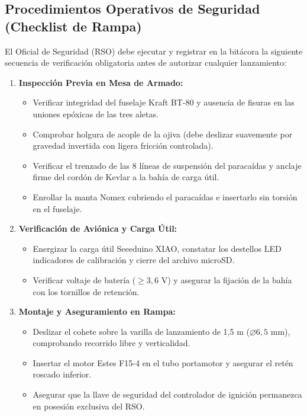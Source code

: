 \subsection{Procedimientos Operativos de Seguridad (Checklist de Rampa)}
El Oficial de Seguridad (RSO) debe ejecutar y registrar en la bitácora la siguiente secuencia de verificación obligatoria antes de autorizar cualquier lanzamiento:
\begin{enumerate}[leftmargin=1.5em]
    \item \textbf{Inspección Previa en Mesa de Armado:}
    \begin{itemize}
        \item Verificar integridad del fuselaje Kraft BT-80 y ausencia de fisuras en las uniones epóxicas de las tres aletas.
        \item Comprobar holgura de acople de la ojiva (debe deslizar suavemente por gravedad invertida con ligera fricción controlada).
        \item Verificar el trenzado de las 8 líneas de suspensión del paracaídas y anclaje firme del cordón de Kevlar a la bahía de carga útil.
        \item Enrollar la manta Nomex cubriendo el paracaídas e insertarlo sin torsión en el fuselaje.
    \end{itemize}
    \item \textbf{Verificación de Aviónica y Carga Útil:}
    \begin{itemize}
        \item Energizar la carga útil Seeeduino XIAO, constatar los destellos LED indicadores de calibración y cierre del archivo microSD.
        \item Verificar voltaje de batería ($\ge 3,6\text{ V}$) y asegurar la fijación de la bahía con los tornillos de retención.
    \end{itemize}
    \item \textbf{Montaje y Aseguramiento en Rampa:}
    \begin{itemize}
        \item Deslizar el cohete sobre la varilla de lanzamiento de 1,5 m ($\varnothing 6,5\text{ mm}$), comprobando recorrido libre y verticalidad.
        \item Insertar el motor Estes F15-4 en el tubo portamotor y asegurar el retén roscado inferior.
        \item Asegurar que la llave de seguridad del controlador de ignición permanezca en posesión exclusiva del RSO.
    \end{itemize}

\end{enumerate}
